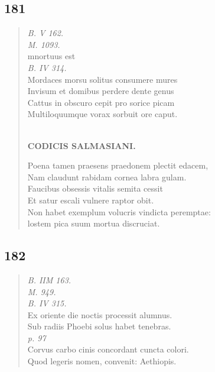 \documentclass[11pt, a4paper]{report}
\begin{document}
            \subsection*{181}
      \begin{verse}
      \textit{B. V 162.} \\ \textit{M. 1093.} \\ mnortuus est \\ \textit{B. IV 314.} \\ Mordaces morsu solitus consumere mures \\ Invisum et domibus perdere dente genus \\ Cattus in obscuro cepit pro sorice picam \\ Multiloquumque vorax sorbuit ore caput. \\ 
        ﻿\pagebreak 
    \begin{center} \textbf{CODICIS SALMASIANI.} \end{center} \marginpar{[155]} Poena tamen praesens praedonem plectit edacem, \\ Nam claudunt rabidam cornea labra gulam. \\ Faucibus obsessis vitalis semita cessit \\ Et satur escali vulnere raptor obit. \\ Non habet exemplum volucris vindicta peremptae: \\ lostem pica suum mortua discruciat. \\ 
      \end{verse}
  
            \subsection*{182}
      \begin{verse}
      \textit{B. IIM 163.} \\ \textit{M. 949.} \\ \textit{B. IV 315.} \\ Ex oriente die noctis processit alumnus. \\ Sub radiis Phoebi solus habet tenebras. \\ \textit{p. 97} \\ Corvus carbo cinis concordant cuncta colori. \\ Quod legeris nomen, convenit: Aethiopis. \\ 
      \end{verse}
  
\end{document}

